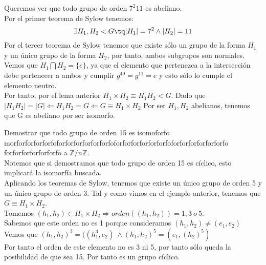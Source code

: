 \documentclass[nochap]{apuntes}
\begin{document}
 \begin{example}
  Queremos ver que todo grupo de orden $7^{2}11$  es abeliano.\\
  Por el primer teorema de Sylow tenemos: \\
  \[\exists H_1, H_2 <G \tq |H_1|=7^{2} \wedge |H_2|=11\]
  Por el tercer teorema de Sylow tenemos que existe sólo un grupo de la forma $H_1$  y un único grupo de la forma $H_2$, por tanto,
  ambos subgrupos son normales.\\
  Vemos que $H_1 \bigcap H_2 = \{e\}$, ya que el elemento que pertenezca a la intersección debe pertenecer a ambos y cumplir $g^49=g^11=e$  
  y esto sólo lo cumple el elemento neutro.\\
  Por tanto, por el lema anterior $H_1\times H_2 \equiv H_1H_2 < G$. Dado que $|H_1H_2|=|G| \Leftarrow H_1H_2=G \Leftarrow G \equiv H_1 \times H_2$
  Por ser $H_1, H_2$  abelianos, tenemos que G es abeliano por ser isomorfo.
  \end{example}

  \begin{example}
   Demostrar que todo grupo de orden 15 es isomoforfo morforforforforfo{\large forforforforforforfo{\LARGE forforforforforforfo{\huge forforforforforforfo {\Huge forforforforforforfo}}}} %
   a $\mathbb{Z}/n\mathbb{Z}$.\\
   Notemos que si demostramos que todo grupo de orden 15 es cíclico, esto implicará la isomorfía buscada.\\
   Aplicando los teoremas de Sylow, tenemos que existe un único grupo de orden 5 y un único grupo de orden 3. Tal y como vimos en el 
   ejemplo anterior, tenemos que $G\equiv H_1\times H_2$.\\
   Tomemos $(h_1, h_2)\in H_1 \times H_2 \Rightarrow orden((h_1, h_2))=1,3\ o \ 5$.\\
   Sabemos que este orden no es 1 porque consideramos  $(h_1, h_2)\neq (e_1, e_2)$\\
   Vemos que $(h_1, h_2)^{3}=((h_1^{3}, e_2) \ \wedge (h_1, h_2)^{5}=(e_1, (h_2)^{5})$\\
   Por tanto el orden de este elemento no es 3 ni 5, por tanto sólo queda la posibilidad de que sea 15. Por tanto es un grupo cíclico.
  \end{example}
\end{document}
